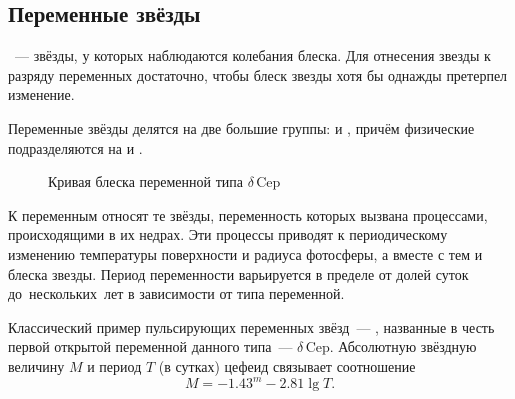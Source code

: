 \subsection{Переменные звёзды}
~--- звёзды, у которых наблюдаются колебания блеска.   Для отнесения звезды к разряду переменных достаточно, чтобы блеск звезды хотя бы однажды претерпел изменение.

Переменные звёзды делятся на две большие группы:  и , причём физические подразделяются на  и .

\begin{wrapfigure}[11]{l}{0.47\tw}
    \centering
    \vspace{-1.2pc}
    \caption{Кривая блеска переменной типа $\delta$\,Cep}
    \label{pic:d-cep}
\end{wrapfigure}
К  переменным  относят те звёзды, переменность которых вызвана процессами, происходящими в их недрах. Эти процессы приводят к периодическому изменению температуры поверхности и радиуса фотосферы, а вместе с тем и блеска звезды. Период переменности варьируется в пределе от долей суток до~нескольких~лет в зависимости от типа переменной.

Классический пример пульсирующих переменных звёзд~--- , названные в честь первой открытой переменной данного типа~--- $\delta$\,Cep. Абсолютную звёздную величину $M$ и период $T$ (в сутках) цефеид связывает соотношение
\begin{equation}
    M = -1.43^m - 2.81\lg T.
\end{equation}

